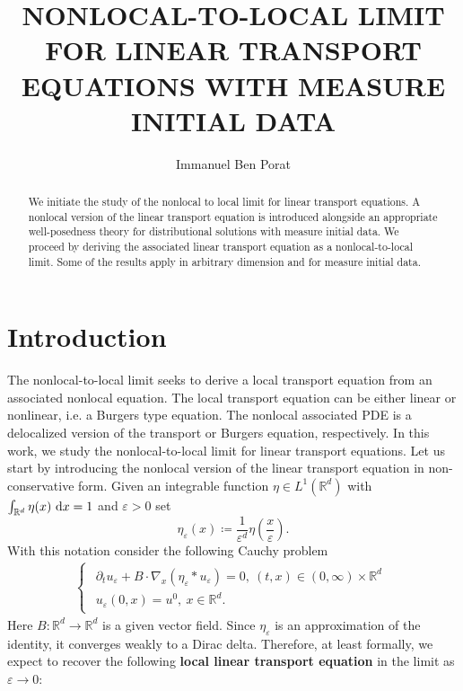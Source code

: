 \documentclass[11pt,reqno]{amsart}
\numberwithin{equation}{section}
\def\dd{{\rm d}}
\begin{document}
\title{NONLOCAL-TO-LOCAL LIMIT FOR LINEAR TRANSPORT EQUATIONS WITH MEASURE INITIAL DATA}
\author{Immanuel Ben Porat}
\begin{abstract}
We initiate the study of the nonlocal to local limit for linear transport equations. A nonlocal version of the linear transport equation is introduced alongside an appropriate well-posedness theory for distributional solutions with measure initial data. We proceed by deriving the associated linear transport equation as a nonlocal-to-local limit. Some of the results apply in arbitrary dimension and for measure initial data.        
\end{abstract}
\maketitle
\section{Introduction}
The nonlocal-to-local limit seeks to derive a local transport equation from an associated  nonlocal equation. The local transport equation can be either linear or nonlinear, i.e. a Burgers type equation. The nonlocal associated PDE  is a delocalized version of the transport or Burgers equation, respectively. In this work, we study the nonlocal-to-local limit for linear transport equations. Let us start by introducing the nonlocal version of the linear transport equation in non-conservative form.  Given an integrable function  $\eta\in L^{1}(\mathbb{R}^{d})$ with $\int_{\mathbb{R}^{d}}\eta(x)\ \dd x=1$ and  $\varepsilon>0$ set $$\eta_{\varepsilon}(x)\coloneqq \frac{1}{\varepsilon^{d}}\eta(\frac{x}{\varepsilon}).$$ 
With this notation consider the following Cauchy problem 
\begin{align}
\begin{cases}
\begin{array}{lc}
\partial_{t}u_{\varepsilon}+B\cdot \nabla_{x}(\eta_{\varepsilon}\ast u_{\varepsilon})=0, \ (t,x)\in (0,\infty)\times \mathbb{R}^{d}\\
u_{\varepsilon}(0,x)=u^{0}, \ x\in \mathbb{R}^{d} .
\end{array}\end{cases}
\label{nonlocal Cauhy problem simplification}
\end{align}
Here $B:\mathbb{R}^{d}\rightarrow \mathbb{R}^{d}$ is a given vector field. Since $\eta_{\varepsilon}$ is an approximation of the identity, it converges weakly to a Dirac delta. Therefore, at least formally, we expect to recover the following \textbf{local linear transport equation} in the limit as $\varepsilon\rightarrow 0$: 
\end{document}
